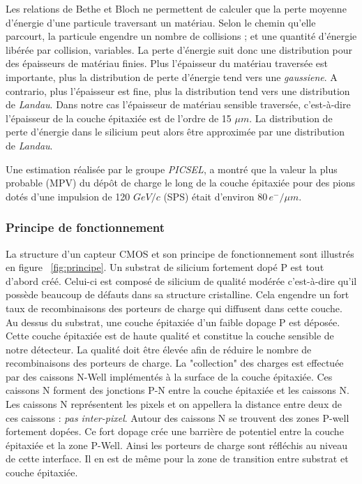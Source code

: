   Les relations de Bethe et Bloch ne permettent de calculer que la perte moyenne d'énergie d'une particule traversant un mat\'eriau. Selon le chemin qu'elle parcourt, la particule engendre un nombre de collisions ; et une quantit\'e d'\'energie lib\'er\'ee par collision, variables. La perte d'\'energie suit donc une distribution pour des \'epaisseurs de mat\'eriau finies. Plus l'\'epaisseur du mat\'eriau travers\'ee est importante, plus la distribution de perte d'\'energie tend vers une \textit{gaussiene}. A contrario, plus l'\'epaisseur est fine, plus la distribution tend vers une distribution de \textit{Landau}. Dans notre cas l'\'epaisseur de mat\'eriau sensible travers\'ee, c'est-\`a-dire l'\'epaisseur de la couche épitaxiée est de l'ordre de 15 $\mu m$. La distribution de perte d'\'energie dans le silicium peut alors \^etre approximée par une distribution de \textit{Landau}.
  
  \medskip

   Une estimation r\'ealis\'ee par le groupe \textit{PICSEL}, a montr\'e que la valeur la plus probable (MPV) du d\'epôt de charge le long de la couche épitaxiée pour des pions dot\'es d'une impulsion de 120 $GeV/c$ (SPS) \'etait d'environ $80 \, e^-/\mu m$.
  
  \subsubsection{Principe de fonctionnement}
  
  La structure d'un capteur CMOS et son principe de fonctionnement sont illustr\'es en figure ~\ref{fig:principe}. Un substrat de silicium fortement dop\'e P est tout d'abord cr\'e\'e. Celui-ci est compos\'e de silicium de qualit\'e mod\'er\'ee c'est-\`a-dire qu'il poss\`ede beaucoup de d\'efauts dans sa structure cristalline. Cela engendre un fort taux de recombinaisons des porteurs de charge qui diffusent dans cette couche. Au dessus du substrat, une couche \'epitaxi\'ee d'un faible dopage P est d\'epos\'ee. Cette couche \'epitaxi\'ee est de haute qualit\'e et constitue la couche sensible de notre d\'etecteur. La qualit\'e doit \^etre \'elev\'ee afin de r\'eduire le nombre de recombinaisons des porteurs de charge. La "collection" des charges est effectu\'ee par des caissons N-Well impl\'ement\'es \`a la surface de la couche \'epitaxi\'ee. Ces caissons N forment des jonctions P-N entre la couche \'epitaxi\'ee et les caissons N. Les caissons N repr\'esentent les pixels et on appellera la distance entre deux de ces caissons : \textit{pas inter-pixel}. Autour des caissons N se trouvent des zones P-well fortement dop\'ees. Ce fort dopage cr\'ee une barri\`ere de potentiel entre la couche \'epitaxi\'ee et la zone P-Well. Ainsi les porteurs de charge sont r\'efl\'echis au niveau de cette interface. Il en est de m\^eme pour la zone de transition entre substrat et couche \'epitaxi\'ee. 
  
